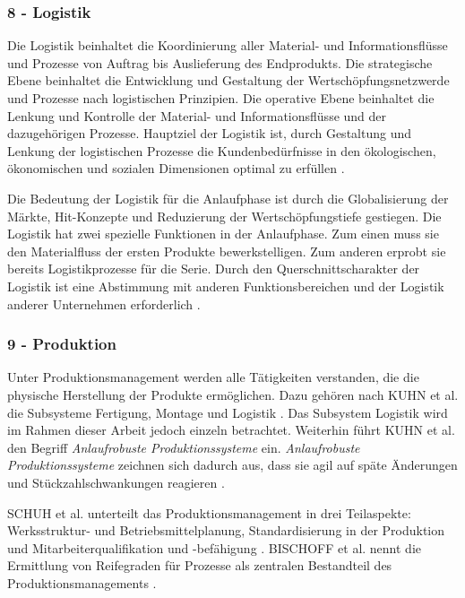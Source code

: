 \subsubsection*{8 - Logistik}

Die Logistik beinhaltet die Koordinierung aller Material- und Informationsflüsse und Prozesse von Auftrag bis Auslieferung des Endprodukts. Die strategische Ebene beinhaltet die Entwicklung und Gestaltung der Wertschöpfungsnetzwerde und Prozesse nach logistischen Prinzipien. Die operative Ebene beinhaltet die Lenkung und Kontrolle der Material- und Informationsflüsse und der dazugehörigen Prozesse. 
Hauptziel der Logistik ist, durch Gestaltung und Lenkung der logistischen Prozesse die Kundenbedürfnisse in den ökologischen, ökonomischen und sozialen Dimensionen optimal zu erfüllen \cite[28]{Schmitt2015}. 

Die Bedeutung der Logistik für die Anlaufphase ist durch die Globalisierung der Märkte, Hit-Konzepte und Reduzierung der 
Wertschöpfungstiefe gestiegen. Die Logistik hat zwei spezielle Funktionen in der Anlaufphase. Zum einen muss sie den Materialfluss der ersten Produkte bewerkstelligen. Zum anderen erprobt sie bereits Logistikprozesse für die Serie.
Durch den Querschnittscharakter der Logistik ist eine Abstimmung mit anderen Funktionsbereichen und der Logistik anderer Unternehmen erforderlich \cite[1189]{Pfohl2000}.

\subsubsection*{9 - Produktion}
Unter Produktionsmanagement werden alle Tätigkeiten verstanden, die die physische Herstellung der Produkte ermöglichen. Dazu gehören nach KUHN et al. die Subsysteme Fertigung, Montage und Logistik \cite{Kuhn2002}. Das Subsystem Logistik wird im Rahmen dieser Arbeit jedoch einzeln betrachtet. Weiterhin führt KUHN et al. den Begriff \textit{Anlaufrobuste Produktionssysteme} ein. \textit{Anlaufrobuste Produktionssysteme} zeichnen sich dadurch aus, dass sie agil auf späte Änderungen und Stückzahlschwankungen reagieren \cite[20]{Bischoff2007}. 

SCHUH et al. unterteilt das Produktionsmanagement in drei Teilaspekte: Werksstruktur- und Betriebsmittelplanung, Standardisierung in der Produktion und Mitarbeiterqualifikation und {-befähigung} \cite[177]{Schuh2008}. 
BISCHOFF et al. nennt die Ermittlung von Reifegraden für Prozesse als zentralen Bestandteil des Produktionsmanagements \cite[20]{Bischoff2007}. 

